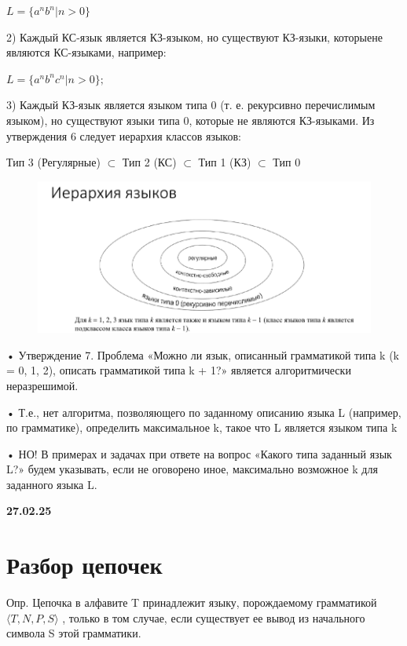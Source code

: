 \documentclass{article}
\begin{document}
$L = \{ a^n b^n | n  > 0 \}  $

2) Каждый КС-язык является КЗ-языком, но существуют КЗ-языки,
которыене являются КС-языками, например:

$ L = \{a^n b^n c^n | n > 0\}; $

3) Каждый КЗ-язык является языком типа 0 (т. е. рекурсивно перечислимым
языком), но существуют языки типа 0, которые не являются КЗ-языками.
Из утверждения 6 следует иерархия классов языков:

Тип 3 (Регулярные) $\subset$ Тип 2 (КС)  $\subset$ Тип 1 (КЗ)  $\subset$ Тип 0

\begin{figure}[H]
    \centering
    \includegraphics[width=1\linewidth]{Снимок экрана 2025-02-27 084055.png}
\end{figure}


• Утверждение 7. Проблема «Можно ли язык, описанный
грамматикой типа k (k = 0, 1, 2), описать грамматикой типа k + 1?»
является алгоритмически неразрешимой.

• Т.е., нет алгоритма, позволяющего по заданному описанию языка L
(например, по грамматике), определить максимальное k, такое что L
является языком типа k

• НО! В примерах и задачах при ответе на вопрос «Какого типа заданный
язык L?» будем указывать, если не оговорено иное, максимально
возможное k для заданного языка L.

\textbf{27.02.25}

\section{Разбор цепочек}

Опр. Цепочка в алфавите T принадлежит языку, порождаемому грамматикой
$ \langle  T, N, P, S \rangle $ , только в том случае, если существует ее вывод из начального
символа S этой грамматики.
\end{document}
